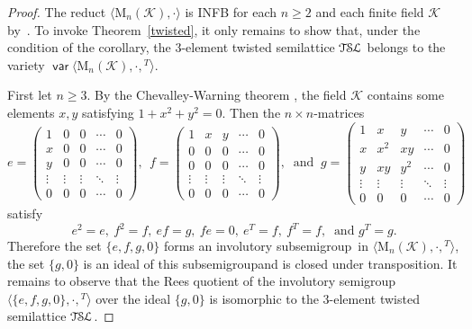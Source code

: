 \documentclass[smallextended]{svjour3}
\newcommand{\sgp}{semi\-group}
\newcommand{\is}{involutory semi\-group}
\newcommand{\TSL}{\ensuremath{\mathcal{T\kern-.5pt S\kern-.5pt L}}}
\DeclareMathOperator{\var}{\mathsf{var}}
\begin{document}
\begin{proof}
The reduct $\langle\mathrm{M}_n(\mathcal{K}),\cdot\rangle$ is INFB for each $n\ge2$ and each finite field $\mathcal{K}$
by~\cite[Corollary~6.2]{sapirburnside}. To invoke Theorem~\ref{twisted}, it only remains to show that, under the condition of the
corollary, the 3-element twisted semilattice $\TSL$ belongs to the variety $\var\langle\mathrm{M}_n(\mathcal{K}),\cdot,{}^T\rangle$.

First let $n\ge3$. By the Chevalley-Warning theorem \cite[Corollary~2 in \S1.2]{Serre}, the field $\mathcal{K}$ contains some elements
$x,y$ satisfying $1+x^2+y^2=0$. Then the $n\times n$-matrices
$$e=\begin{pmatrix}
1 & 0 & 0 & \cdots & 0\\
x & 0 & 0 & \cdots & 0\\
y & 0 & 0 & \cdots & 0\\
\vdots & \vdots & \vdots &\ddots & \vdots\\
0 & 0 & 0 & \cdots & 0
\end{pmatrix},\ \ f=
\begin{pmatrix} 1 & x & y & \cdots & 0\\
0 & 0 & 0 & \cdots & 0\\
0 & 0 & 0 & \cdots & 0\\
\vdots & \vdots & \vdots &\ddots & \vdots\\
0 & 0 & 0 & \cdots & 0
\end{pmatrix},\ \text{ and }\
g=
\begin{pmatrix} 1 & x & y & \cdots & 0\\
x & x^2 & xy & \cdots & 0\\
y & xy & y^2 & \cdots & 0\\
\vdots & \vdots & \vdots &\ddots & \vdots\\
0 & 0 & 0 & \cdots & 0
\end{pmatrix}$$
satisfy
$$e^2=e,\ f^2=f,\ ef=g,\ fe=0,\ e^T=f,\ f^T=f,\ \text{ and } g^T=g.$$
Therefore the set $\{e,f,g,0\}$ forms an involutory sub\sgp\ in $\langle\mathrm{M}_n(\mathcal{K}),\cdot,{}^T\rangle$, the set $\{g,0\}$ is
an ideal of this sub\sgp and is closed under transposition. It remains to observe that the Rees quotient of the \is\
$\langle\{e,f,g,0\},\cdot,{}^T\rangle$ over the ideal $\{g,0\}$ is isomorphic to the 3-element twisted semilattice $\TSL$.


\end{proof}
\end{document}
